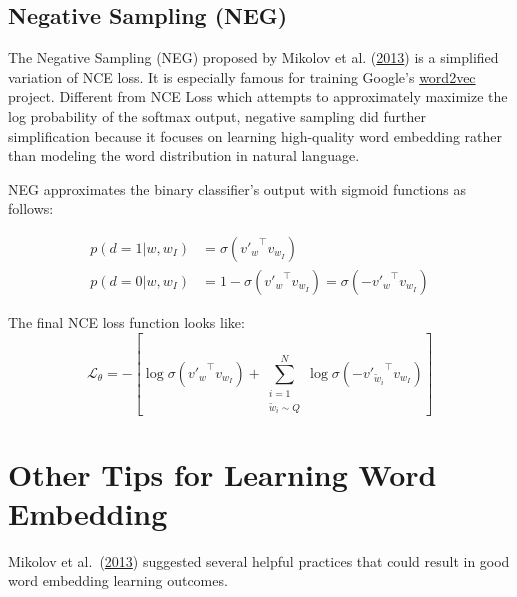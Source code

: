 \subsection{Negative Sampling (NEG)}
The Negative Sampling (NEG) proposed by Mikolov et al. (\href{https://papers.nips.cc/paper/5021-distributed-representations-of-words-and-phrases-and-their-compositionality.pdf}{2013}) is a simplified variation of NCE loss. It is especially famous for training Google's \href{https://code.google.com/archive/p/word2vec/}{word2vec} project. Different from NCE Loss which attempts to approximately maximize the log probability of the softmax output, negative sampling did further simplification because it focuses on learning high-quality word embedding rather than modeling the word distribution in natural language.

NEG approximates the binary classifier's output with sigmoid functions as follows:

\begin{align*}
p(d=1 \vert w, w_I) &= \sigma({v'_{w}}^\top v_{w_I}) \\
p(d=0 \vert w, w_I) &= 1 - \sigma({v'_{w}}^\top v_{w_I}) = \sigma(-{v'_{w}}^\top v_{w_I})
\end{align*}


The final NCE loss function looks like:
\[
\mathcal{L}_\theta = - [ \log \sigma({v'_{w}}^\top v_{w_I}) +  \sum_{\substack{i=1 \\ \tilde{w}_i \sim Q}}^N \log \sigma(-{v'_{\tilde{w}_i}}^\top v_{w_I})]
\]

\section{Other Tips for Learning Word Embedding}

Mikolov et al.\ (\href{https://papers.nips.cc/paper/5021-distributed-representations-of-words-and-phrases-and-their-compositionality.pdf}{2013}) suggested several helpful practices that could result in good word embedding learning outcomes.

